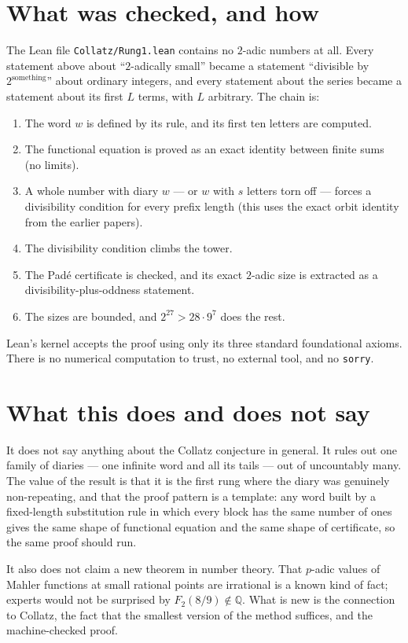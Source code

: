 \documentclass[11pt]{article}
\begin{document}
\section{What was checked, and how}

The Lean file \texttt{Collatz/Rung1.lean} contains no $2$-adic
numbers at all. Every statement above about ``$2$-adically small''
became a statement ``divisible by $2^{\text{something}}$'' about
ordinary integers, and every statement about the series became a
statement about its first $L$ terms, with $L$ arbitrary. The chain is:
\begin{enumerate}
\item The word $w$ is defined by its rule, and its first ten letters
  are computed.
\item The functional equation is proved as an exact identity between
  finite sums (no limits).
\item A whole number with diary $w$ --- or $w$ with $s$ letters torn
  off --- forces a divisibility condition for every prefix length
  (this uses the exact orbit identity from the earlier papers).
\item The divisibility condition climbs the tower.
\item The Pad\'e certificate is checked, and its exact $2$-adic size
  is extracted as a divisibility-plus-oddness statement.
\item The sizes are bounded, and $2^{27} > 28 \cdot 9^7$ does the
  rest.
\end{enumerate}
Lean's kernel accepts the proof using only its three standard
foundational axioms. There is no numerical computation to trust, no
external tool, and no \texttt{sorry}.

\section{What this does and does not say}

It does not say anything about the Collatz conjecture in general.
It rules out one family of diaries --- one infinite word and all its
tails --- out of uncountably many. The value of the result is that it
is the first rung where the diary was genuinely non-repeating, and
that the proof pattern is a template: any word built by a fixed-length
substitution rule in which every block has the same number of ones
gives the same shape of functional equation and the same shape of
certificate, so the same proof should run.

It also does not claim a new theorem in number theory. That $p$-adic
values of Mahler functions at small rational points are irrational is
a known kind of fact; experts would not be surprised by
$F_2(8/9) \notin \mathbb{Q}$. What is new is the connection to
Collatz, the fact that the smallest version of the method suffices,
and the machine-checked proof.
\end{document}
